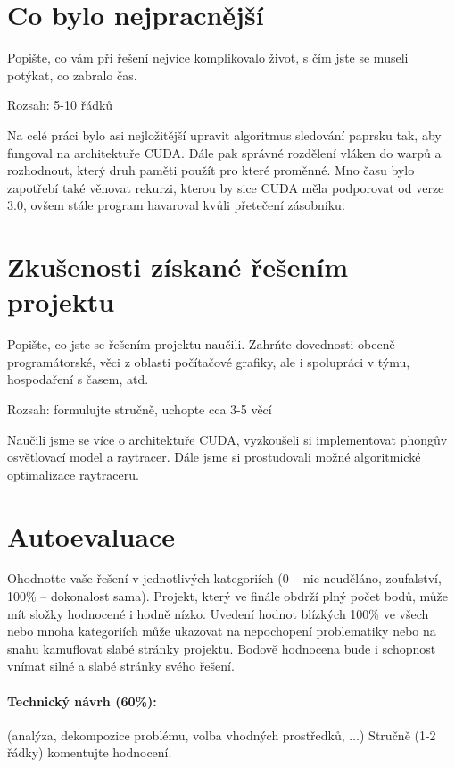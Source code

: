 \documentclass[12pt,a4paper,titlepage,final]{report}
\begin{document}
\section{Co bylo nejpracnější}

Popište, co vám při řešení nejvíce komplikovalo život, s čím jste se museli
potýkat, co zabralo čas.

Rozsah: 5-10 řádků

Na celé práci bylo asi nejložitější upravit algoritmus sledování paprsku tak,
aby fungoval na architektuře CUDA. Dále pak správné rozdělení vláken do warpů 
a rozhodnout, který druh paměti použít pro které proměnné. Mno času bylo zapotřebí  
také věnovat rekurzi, kterou by sice CUDA měla podporovat od verze 3.0,  
ovšem stále program havaroval kvůli přetečení zásobníku.

\section{Zkušenosti získané řešením projektu}

Popište, co jste se řešením projektu naučili. Zahrňte dovednosti obecně
programátorské, věci z oblasti počítačové grafiky, ale i spolupráci v týmu,
hospodaření s časem, atd.

Rozsah: formulujte stručně, uchopte cca 3-5 věcí

Naučili jsme se více o architektuře CUDA, vyzkoušeli si implementovat phongův osvětlovací model a
raytracer. Dále jsme si prostudovali možné algoritmické optimalizace raytraceru.

\section{Autoevaluace}

Ohodnoťte vaše řešení v jednotlivých kategoriích (0 – nic neuděláno,
zoufalství, 100\% – dokonalost sama). Projekt, který ve finále obdrží plný
počet bodů, může mít složky hodnocené i hodně nízko. Uvedení hodnot blízkých
100\% ve všech nebo mnoha kategoriích může ukazovat na nepochopení problematiky
nebo na snahu kamuflovat slabé stránky projektu. Bodově hodnocena bude i
schopnost vnímat silné a slabé stránky svého řešení.

\paragraph{Technický návrh (60\%):} (analýza, dekompozice problému, volba
vhodných prostředků, $\ldots$) 
Stručně (1-2 řádky) komentujte hodnocení. 
\end{document}
